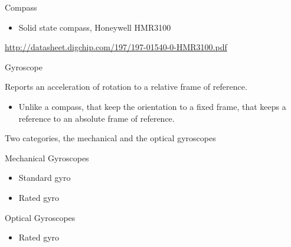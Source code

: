 \documentclass[compress]{beamer}
\begin{document}
\begin{frame}{Compass}

\begin{itemize}

\item
  Solid state compass, \eg Honeywell HMR3100
\end{itemize}

\url{http://datasheet.digchip.com/197/197-01540-0-HMR3100.pdf}

\end{frame}

\begin{frame}{Gyroscope}

Reports an acceleration of rotation to a relative frame of reference.

\begin{itemize}

\item
  Unlike a compass, that keep the orientation to a fixed frame, that
  keeps a reference to an absolute frame of reference.
\end{itemize}

Two categories, the mechanical and the optical gyroscopes

Mechanical Gyroscopes

\begin{itemize}

\item
  Standard gyro
\item
  Rated gyro
\end{itemize}

Optical Gyroscopes

\begin{itemize}

\item
  Rated gyro
\end{itemize}

\end{frame}
\end{document}
